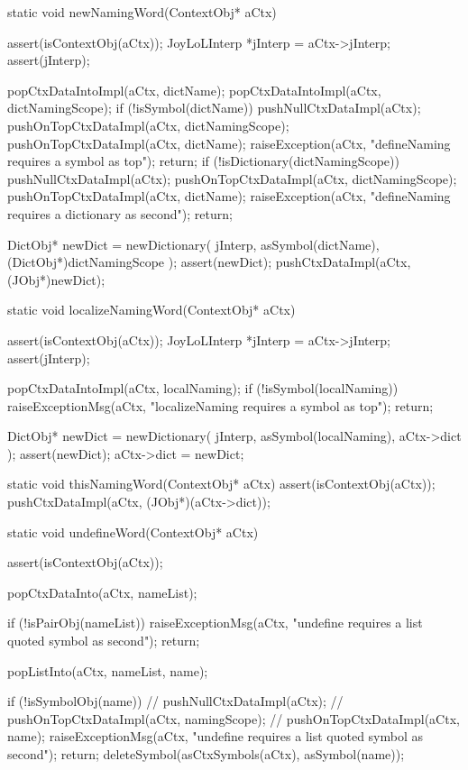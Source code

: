 \startCCode
static void newNamingWord(ContextObj* aCtx) {
  assert(isContextObj(aCtx));
  JoyLoLInterp *jInterp = aCtx->jInterp;
  assert(jInterp);

  popCtxDataIntoImpl(aCtx, dictName);
  popCtxDataIntoImpl(aCtx, dictNamingScope);
  if (!isSymbol(dictName)) {
    pushNullCtxDataImpl(aCtx);
    pushOnTopCtxDataImpl(aCtx, dictNamingScope);
    pushOnTopCtxDataImpl(aCtx, dictName);
    raiseException(aCtx,
      "defineNaming requires a symbol as top");
    return;
  }
  if (!isDictionary(dictNamingScope)) {
    pushNullCtxDataImpl(aCtx);
    pushOnTopCtxDataImpl(aCtx, dictNamingScope);
    pushOnTopCtxDataImpl(aCtx, dictName);
    raiseException(aCtx,
      "defineNaming requires a dictionary as second");
    return;
  }

  DictObj* newDict =
    newDictionary(
      jInterp,
      asSymbol(dictName),
      (DictObj*)dictNamingScope
    );
  assert(newDict);
  pushCtxDataImpl(aCtx, (JObj*)newDict);
}
\stopCCode

\startCCode
static void localizeNamingWord(ContextObj* aCtx) {
  assert(isContextObj(aCtx));
  JoyLoLInterp *jInterp = aCtx->jInterp;
  assert(jInterp);
  
  popCtxDataIntoImpl(aCtx, localNaming);
  if (!isSymbol(localNaming)){
    raiseExceptionMsg(aCtx,
      "localizeNaming requires a symbol as top");
    return;
  }
  
  DictObj* newDict = 
    newDictionary(
      jInterp,
      asSymbol(localNaming),
      aCtx->dict
    );
  assert(newDict);
  aCtx->dict = newDict;
}
\stopCCode

\startCCode
static void thisNamingWord(ContextObj* aCtx) {
  assert(isContextObj(aCtx));
  pushCtxDataImpl(aCtx, (JObj*)(aCtx->dict));
}
\stopCCode
\stoptyping

\startCCode
static void undefineWord(ContextObj* aCtx) {
  assert(isContextObj(aCtx));
  
  popCtxDataInto(aCtx, nameList);

  if (!isPairObj(nameList)) {
    raiseExceptionMsg(aCtx,
      "undefine requires a list quoted symbol as second");
    return;
  }
  
  popListInto(aCtx, nameList, name);
  
  if (!isSymbolObj(name)) {
//    pushNullCtxDataImpl(aCtx);
//    pushOnTopCtxDataImpl(aCtx, namingScope);
//    pushOnTopCtxDataImpl(aCtx, name);
    raiseExceptionMsg(aCtx,
      "undefine requires a list quoted symbol as second");
    return;
  }
  deleteSymbol(asCtxSymbols(aCtx), asSymbol(name));
  }
\stopCCode

